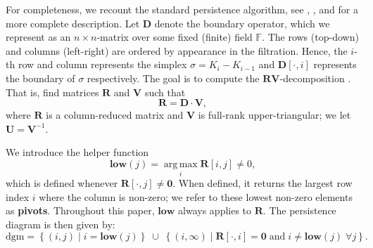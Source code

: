 \documentclass{article}
\newcommand{\field}{\mathbb{F}}
\newcommand{\matsize}[2]{#1\times #2}
\newcommand{\dgm}{\mathrm{dgm}}
\newcommand{\mat}[1]{\mathbf{#1}}
\newcommand{\bdr}{\mat{D}}
\newcommand{\low}{\mathbf{low}}
\DeclareMathOperator*{\argmax}{arg\,max}
\begin{document}
For completeness, we recount the standard persistence algorithm, see \cite{edelsbrunner2002topological}, \cite{zomorodian2004computing}, and \cite{edelsbrunner2022computational} for a more complete description. Let $\bdr$ denote the boundary operator, which we represent as an $\matsize{n}{n}$-matrix over some fixed (finite) field $\field$. 
%
%
%
The rows (top-down) and columns (left-right) are ordered by appearance in the filtration. Hence, the $i$-th row and column represents the simplex $\sigma = K_i - K_{i-1}$  and $\bdr[\cdot,i]$ represents the boundary of $\sigma$ respectively. 
%
%
The goal is to compute the $\mat{RV}$-decomposition \cite{cohen2006vines}. That
is, find matrices $\mat{R}$ and $\mat{V}$ such that 
\[\mat{R} = \bdr\cdot \mat{V},\]
where $\mat{R}$ is a column-reduced matrix and $\mat{V}$ is full-rank
upper-triangular; we let $\mat{U} = \mat{V}^{-1}$.

We introduce the helper function 
\[\low(j) = 
\argmax\limits_{i} \mat{R}[i,j]\neq 0,  \]
which is defined whenever $\mat{R}[\cdot,j] \neq \mat{0}$.  
When defined, it returns the largest row index $i$ where the column is non-zero; we refer to these lowest
non-zero elements as \textbf{pivots}. Throughout this paper, $\low$ always applies to $\mat{R}$.  The persistence diagram is then given by:
\[\dgm =  \left\{(i,j) \mid
    i = \low(j) \right\}
    \; \cup \;
    \left\{
        (i, \infty) \mid
            \mat{R}[\cdot,i]= \mat{0} \;\mbox{and}\;
            i \neq \low(j) \;\forall j
    \right\}.
    \]
\end{document}
